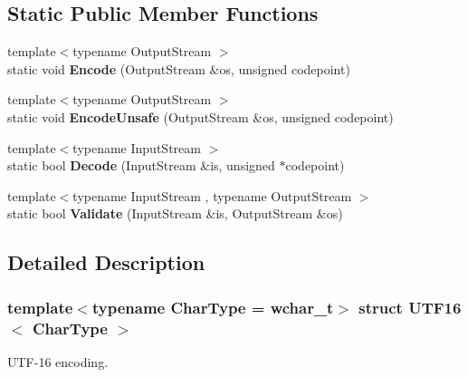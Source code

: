 \subsection*{Static Public Member Functions}
\begin{DoxyCompactItemize}
\item 
\mbox{\label{struct_u_t_f16_a9d8ded01244e30d037c4afa10ee2b30e}} 
{\footnotesize template$<$typename Output\+Stream $>$ }\\static void {\bfseries Encode} (Output\+Stream \&os, unsigned codepoint)
\item 
\mbox{\label{struct_u_t_f16_aa67661e756c273871b574e7133b7fc63}} 
{\footnotesize template$<$typename Output\+Stream $>$ }\\static void {\bfseries Encode\+Unsafe} (Output\+Stream \&os, unsigned codepoint)
\item 
\mbox{\label{struct_u_t_f16_a124c79dfd9f9b4c3fb65bd55ba17b4be}} 
{\footnotesize template$<$typename Input\+Stream $>$ }\\static bool {\bfseries Decode} (Input\+Stream \&is, unsigned $\ast$codepoint)
\item 
\mbox{\label{struct_u_t_f16_a7516184ed5dce10c0e7895bec124d97d}} 
{\footnotesize template$<$typename Input\+Stream , typename Output\+Stream $>$ }\\static bool {\bfseries Validate} (Input\+Stream \&is, Output\+Stream \&os)
\end{DoxyCompactItemize}


\subsection{Detailed Description}
\subsubsection*{template$<$typename Char\+Type = wchar\+\_\+t$>$\newline
struct U\+T\+F16$<$ Char\+Type $>$}

U\+T\+F-\/16 encoding. 

